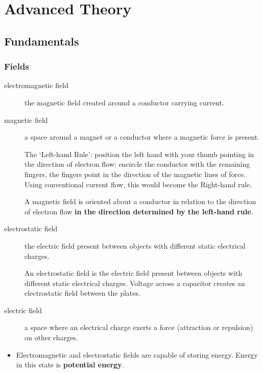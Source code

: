 \documentclass[letterpaper]{article}
\begin{document}
    \newpage

    
    \section{Advanced Theory}
        \subsection{Fundamentals}
        \subsubsection{Fields}
        \begin{description}
            \item[electromagnetic field] the magnetic field created around a conductor carrying current.
            \item[magnetic field] a space around a magnet or a conductor where a magnetic force is present.

                The `Left-hand Rule':
                position the left hand with your thumb pointing in the direction of electron flow;
                encircle the conductor with the remaining fingers, the fingers point in the direction of the magnetic lines of force.
                Using conventional current flow, this would become the Right-hand rule.

                A magnetic field is oriented about a conductor in relation to the direction of electron flow \textbf{in the direction determined by the left-hand rule}.

            \item[electrostatic field] the electric field present between objects with different static electrical charges.

                An electrostatic field is the electric field present between objects with different static electrical charges.
                Voltage across a capacitor creates an electrostatic field between the plates.

            \item[electric field] a space where an electrical charge exerts a force (attraction or repulsion) on other charges.
        \end{description}

        \begin{itemize}
            \item Electromagnetic and electrostatic fields are capable of storing energy. Energy in this state is \textbf{potential energy}.
        \end{itemize}
\end{document}
